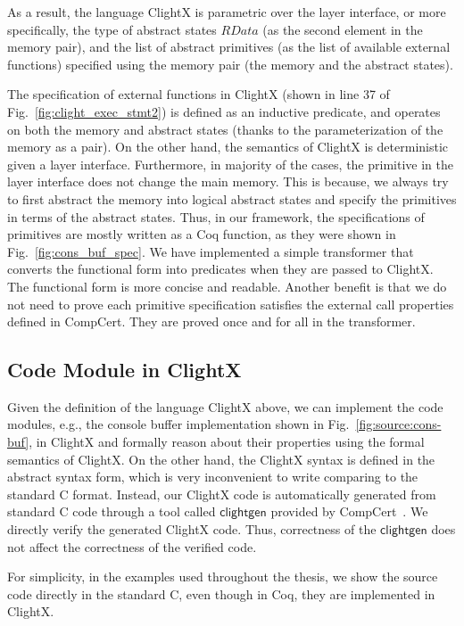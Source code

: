 As a result, the language ClightX is parametric over the layer interface,
or more specifically, the type of abstract states $RData$ (as the second
element in the memory pair), and the list of abstract primitives (as the
list of available external functions) specified using the memory pair
(the memory and the abstract states).

The specification of external functions in ClightX (shown in line 37 of
Fig.~\ref{fig:clight_exec_stmt2}) is defined as an inductive predicate,
and operates on both the memory and abstract states (thanks to the parameterization
of the memory as a pair). On the other hand, the semantics of ClightX is
deterministic given a layer interface. Furthermore, in majority of the
cases, the primitive in the layer interface does not change the main memory.
This is because, we always try to first abstract the memory into logical
abstract states and specify the primitives in terms of the abstract
states. Thus, in our framework, the specifications of primitives
are mostly written as a Coq function, as they were shown in Fig.~\ref{fig:cons_buf_spec}.
We have implemented a simple transformer that converts the functional form
into predicates when they are passed to ClightX. The functional form
is more concise and readable. Another benefit is that we do not need to
prove each primitive specification satisfies the external call properties
defined in CompCert. They are proved once and for all in the transformer.

\subsection{Code Module in ClightX}

Given the definition of the language ClightX above,
we can implement the code modules, e.g., the console buffer
implementation shown in Fig.~\ref{fig:source:cons-buf}, in ClightX
and formally reason about their properties using the formal semantics
of ClightX. On the other hand, the ClightX syntax is defined
in the abstract syntax form, which is very inconvenient
to write comparing to the standard C format. Instead,
our ClightX code is automatically generated from standard C code
through a tool called $\textsf{clightgen}$ provided by CompCert~\cite{compcert}.
We directly verify the generated ClightX code. Thus, correctness
of the $\textsf{clightgen}$ does not affect the correctness of
the verified code.

For simplicity, in the examples used throughout the thesis, we show
the source code directly in the standard C, even though in Coq, they
are implemented in ClightX.


